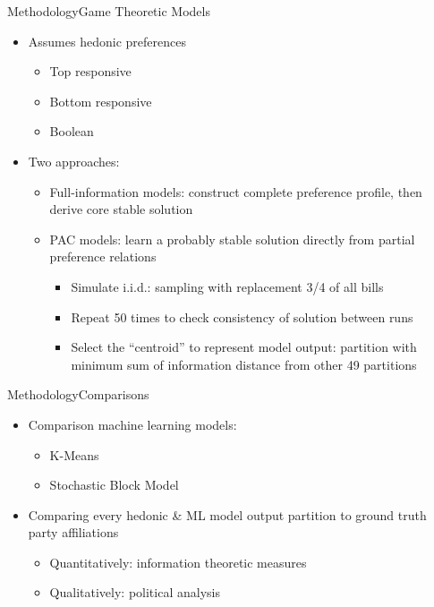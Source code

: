 \documentclass[xcolor=dvipsnames]{beamer}
\begin{document}
\begin{frame}{Methodology}{Game Theoretic Models}
  \begin{itemize}
    \item Assumes hedonic preferences
    \begin{itemize}
      \item Top responsive
      \item Bottom responsive
      \item Boolean
    \end{itemize}
    \item<2-> Two approaches:
    \begin{itemize}
      \item Full-information models: construct complete preference profile, then derive core stable solution
      \item PAC models: learn a probably stable solution directly from partial preference relations
      \begin{itemize}
        \item<3-> Simulate i.i.d.: sampling with replacement 3/4 of all bills
        \item<3-> Repeat 50 times to check consistency of solution between runs
        \item<3-> Select the ``centroid'' to represent model output: partition with minimum sum of information distance from other 49 partitions
      \end{itemize}
    \end{itemize}
  \end{itemize}
\end{frame}

\begin{frame}{Methodology}{Comparisons}
  \begin{itemize}
    \item Comparison machine learning models:
    \begin{itemize}
      \item K-Means
      \item Stochastic Block Model
    \end{itemize}
    \item Comparing every hedonic \& ML model output partition to ground truth party affiliations
    \begin{itemize}
      \item Quantitatively: information theoretic measures
      \item Qualitatively: political analysis
    \end{itemize}
  \end{itemize}
\end{frame}
\end{document}
